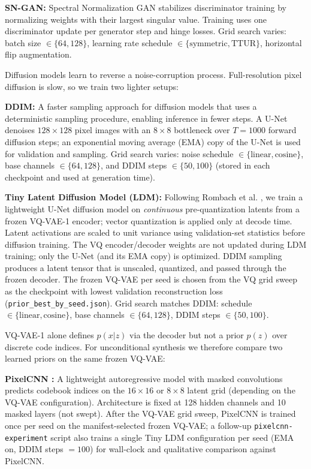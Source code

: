 \documentclass[cameraready]{Interspeech}
\begin{document}
\begin{description}[leftmargin=1.25em, labelsep=0.5em, itemsep=0.6em, topsep=0.4em]
\textbf{SN-GAN:} Spectral Normalization GAN \cite{DBLP:journals/corr/abs-1802-05957} stabilizes discriminator training by normalizing weights with their largest singular value. Training uses one discriminator update per generator step and hinge losses. Grid search varies: batch size $\in \{64, 128\}$, learning rate schedule $\in \{\text{symmetric}, \text{TTUR}\}$, horizontal flip augmentation.

\item[Diffusion Models]
Diffusion models learn to reverse a noise-corruption process. Full-resolution pixel diffusion is slow, so we train two lighter setups:

\textbf{DDIM:} A faster sampling approach for diffusion models \cite{DBLP:journals/corr/abs-2010-02502} that uses a deterministic sampling procedure, enabling inference in fewer steps. A U-Net denoises $128 \times 128$ pixel images with an $8 \times 8$ bottleneck over $T{=}1000$ forward diffusion steps; an exponential moving average (EMA) copy of the U-Net is used for validation and sampling. Grid search varies: noise schedule $\in \{\text{linear}, \text{cosine}\}$, base channels $\in \{64, 128\}$, and DDIM steps $\in \{50, 100\}$ (stored in each checkpoint and used at generation time).

\textbf{Tiny Latent Diffusion Model (LDM):} Following Rombach et al. \cite{Rombach_2022_CVPR}, we train a lightweight U-Net diffusion model on \emph{continuous} pre-quantization latents from a frozen VQ-VAE-1 encoder; vector quantization is applied only at decode time. Latent activations are scaled to unit variance using validation-set statistics before diffusion training. The VQ encoder/decoder weights are not updated during LDM training; only the U-Net (and its EMA copy) is optimized. DDIM sampling produces a latent tensor that is unscaled, quantized, and passed through the frozen decoder. The frozen VQ-VAE per seed is chosen from the VQ grid sweep as the checkpoint with lowest validation reconstruction loss (\texttt{prior\_best\_by\_seed.json}). Grid search matches DDIM: schedule $\in \{\text{linear}, \text{cosine}\}$, base channels $\in \{64, 128\}$, DDIM steps $\in \{50, 100\}$.

\item[PixelCNN Prior over VQ Codes (Baseline)]
VQ-VAE-1 alone defines $p(x|z)$ via the decoder but not a prior $p(z)$ over discrete code indices. For unconditional synthesis we therefore compare two learned priors on the same frozen VQ-VAE:

\textbf{PixelCNN \cite{oord2016pixel}:} A lightweight autoregressive model with masked convolutions predicts codebook indices on the $16 \times 16$ or $8 \times 8$ latent grid (depending on the VQ-VAE configuration). Architecture is fixed at 128 hidden channels and 10 masked layers (not swept). After the VQ-VAE grid sweep, PixelCNN is trained once per seed on the manifest-selected frozen VQ-VAE; a follow-up \texttt{pixelcnn-experiment} script also trains a single Tiny LDM configuration per seed (EMA on, DDIM steps $=100$) for wall-clock and qualitative comparison against PixelCNN.
\end{description}
\end{document}
